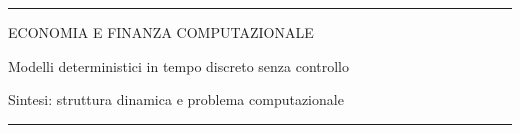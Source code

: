 \documentclass[12pt,aspectratio=169]{beamer}
\begin{document}
\begin{frame}
\unitlength 5mm

\begin{center}

\rule{\textwidth}{2pt}

\vskip3mm
ECONOMIA E FINANZA COMPUTAZIONALE

Modelli deterministici in tempo discreto senza controllo

Sintesi: struttura dinamica e problema computazionale
\rule{\textwidth}{2pt}

\end{center}

\end{frame}


\end{document}
